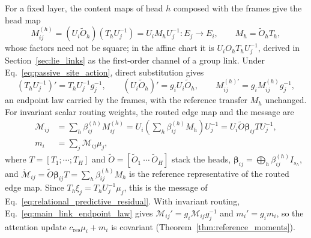 \documentclass[twoside,11pt]{article}
\begin{document}
For a fixed layer, the content maps of head \(h\) composed with the frames give the head map
\begin{equation}
M_{ij}^{(h)}=(U_i\widetilde O_h)(T_hU_j^{-1})
=U_iM_hU_j^{-1}:E_j\longrightarrow E_i,
\qquad M_h=\widetilde O_hT_h,
\label{eq:main_content_link}
\end{equation}
whose factors need not be square; in the affine chart it is \(U_iO_hT_hU_j^{-1}\), derived in Section~\ref{sec:lie_links} as the first-order channel of a group link. Under Eq.~\eqref{eq:passive_site_action}, direct substitution gives
\begin{equation}
(T_hU_j^{-1})'=T_hU_j^{-1}g_j^{-1},\qquad
(U_i\widetilde O_h)'=g_iU_i\widetilde O_h,\qquad
M_{ij}^{(h)\prime}=g_iM_{ij}^{(h)}g_j^{-1},
\label{eq:main_link_endpoint_law}
\end{equation}
an endpoint law carried by the frames, with the reference transfer \(M_h\) unchanged. For invariant scalar routing weights, the routed edge map and the message are
\begin{align}
\mathcal M_{ij}&=\sum_h\beta_{ij}^{(h)}M_{ij}^{(h)}
=U_i\left(\sum_h\beta_{ij}^{(h)}M_h\right)U_j^{-1}
=U_i\widetilde O\boldsymbol\beta_{ij}TU_j^{-1},\\
m_i&=\sum_j\mathcal M_{ij}\mu_j,
\label{eq:main_routed_link}
\end{align}
where \(T=[T_1;\cdots;T_H]\) and \(\widetilde O=[\widetilde O_1\ \cdots\ \widetilde O_H]\) stack the heads, \(\boldsymbol\beta_{ij}=\bigoplus_h\beta_{ij}^{(h)}I_{s_h}\), and \(\mathring{\mathcal M}_{ij}=\widetilde O\boldsymbol\beta_{ij}T=\sum_h\beta_{ij}^{(h)}M_h\) is the reference representative of the routed edge map. Since \(T_h\xi_j=T_hU_j^{-1}\mu_j\), this is the message of Eq.~\eqref{eq:relational_predictive_residual}. With invariant routing, Eq.~\eqref{eq:main_link_endpoint_law} gives \(\mathcal M_{ij}'=g_i\mathcal M_{ij}g_j^{-1}\) and \(m_i'=g_im_i\), so the attention update \(c_{\mathrm{res}}\mu_i+m_i\) is covariant (Theorem~\ref{thm:reference_moments}).
\end{document}
